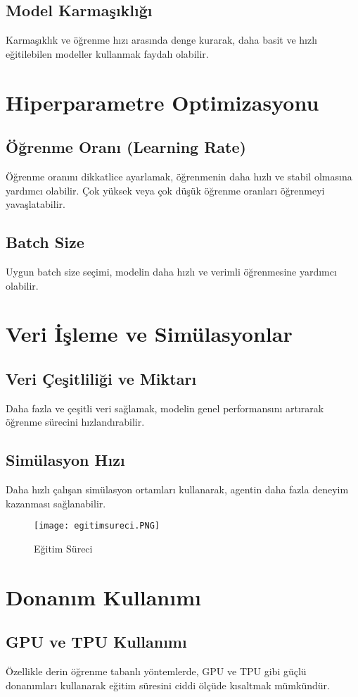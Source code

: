 \documentclass{article}
\begin{document}
\subsection{Model Karmaşıklığı}
Karmaşıklık ve öğrenme hızı arasında denge kurarak, daha basit ve hızlı eğitilebilen modeller kullanmak faydalı olabilir.

\section{Hiperparametre Optimizasyonu}
\subsection{Öğrenme Oranı (Learning Rate)}
Öğrenme oranını dikkatlice ayarlamak, öğrenmenin daha hızlı ve stabil olmasına yardımcı olabilir. Çok yüksek veya çok düşük öğrenme oranları öğrenmeyi yavaşlatabilir.

\subsection{Batch Size}
Uygun batch size seçimi, modelin daha hızlı ve verimli öğrenmesine yardımcı olabilir.

\section{Veri İşleme ve Simülasyonlar}
\subsection{Veri Çeşitliliği ve Miktarı}
Daha fazla ve çeşitli veri sağlamak, modelin genel performansını artırarak öğrenme sürecini hızlandırabilir.
\subsection{Simülasyon Hızı}
Daha hızlı çalışan simülasyon ortamları kullanarak, agentin daha fazla deneyim kazanması sağlanabilir.
\begin{figure}[h]
    \centering
    \texttt{[image: egitimsureci.PNG]}
    \caption{Eğitim Süreci}
    \label{fig:resim27}
    \end{figure}
\section{Donanım Kullanımı}
\subsection{GPU ve TPU Kullanımı}
Özellikle derin öğrenme tabanlı yöntemlerde, GPU ve TPU gibi güçlü donanımları kullanarak eğitim süresini ciddi ölçüde kısaltmak mümkündür.
\end{document}

